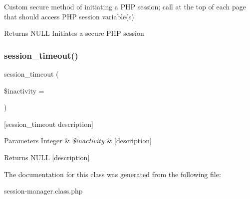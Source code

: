 Custom secure method of initiating a P\+HP session; call at the top of each page that should access P\+HP session variable(s)

\begin{DoxyReturn}{Returns}
N\+U\+LL Initiates a secure P\+HP session 
\end{DoxyReturn}
\mbox{\label{class_w_a_f_f_l_e_1_1_controllers_1_1_session_manager_a0699e69686fe46ec84a3c0b680080414}} 
\subsubsection{\texorpdfstring{session\+\_\+timeout()}{session\_timeout()}}
{\footnotesize\ttfamily session\+\_\+timeout (\begin{DoxyParamCaption}\item[{}]{\$inactivity = {} }\end{DoxyParamCaption})}

\mbox{[}session\+\_\+timeout description\mbox{]}


\begin{DoxyParams}[1]{Parameters}
Integer & {\em \$inactivity} & \mbox{[}description\mbox{]} \\
\hline
\end{DoxyParams}
\begin{DoxyReturn}{Returns}
N\+U\+LL \mbox{[}description\mbox{]} 
\end{DoxyReturn}


The documentation for this class was generated from the following file\+:\begin{DoxyCompactItemize}
\item 
session-\/manager.\+class.\+php\end{DoxyCompactItemize}
